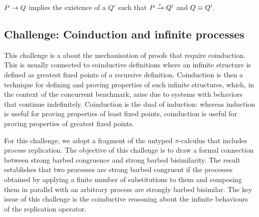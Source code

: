 \documentclass[runningheads]{llncs}
\begin{document}
\begin{theorem}
  \( P \rightarrow Q \) implies the existence of a \( Q' \) such that \( P \xrightarrow{\tau} Q' \) and \( Q \equiv Q' \).
\end{theorem}

\subsection{Challenge: Coinduction and infinite processes}
\label{sec:challenge:coinduction}
This challenge is a about the mechanisation of proofs
that require coinduction.
%
This is usually connected to coinductive definitions where an infinite
structure is defined as greatest fixed points of a recursive
definition.
%
Coinduction is then a technique for defining and proving properties of
such infinite structures,
%
which, in the context of the concurrent benchmark, arise
due to systems with behaviors that continue indefinitely.
%
Coinduction is the dual of induction: whereas induction is useful for
proving properties of least fixed points, coinduction is useful for
proving properties of greatest fixed points.
%
%

For this challenge, we adopt a fragment of the untyped $\pi$-calculus
that includes process replication.
The objective of this challenge is to %
draw a formal connection between strong barbed congruence and strong
barbed bisimilarity.  %
The result establishes that two processes are strong barbed congruent
if the processes obtained by applying a finite number of substitutions to
them and composing them in parallel with an arbitrary process are
strongly barbed bisimilar.
The key issue of this challenge is the coinductive reasoning about the infinite behaviours of the replication operator.
\end{document}
